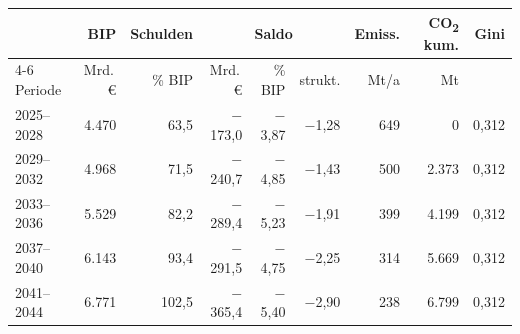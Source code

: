 \begin{tabular}{@{}lrrrrrrrr@{}}
\toprule
 & BIP & Schulden & \multicolumn{3}{c}{Saldo} & Emiss. & CO\textsubscript{2} kum. & Gini \\
\cmidrule(lr){4-6}
Periode & Mrd.\,\euro{} & \% BIP & Mrd.\,\euro{} & \% BIP & strukt. & Mt/a & Mt & \\
\midrule
2025--2028 & 4.470 & 63,5 & $-$173,0 & $-$3,87 & $-$1,28 & 649 & 0 & 0,312 \\
2029--2032 & 4.968 & 71,5 & $-$240,7 & $-$4,85 & $-$1,43 & 500 & 2.373 & 0,312 \\
2033--2036 & 5.529 & 82,2 & $-$289,4 & $-$5,23 & $-$1,91 & 399 & 4.199 & 0,312 \\
2037--2040 & 6.143 & 93,4 & $-$291,5 & $-$4,75 & $-$2,25 & 314 & 5.669 & 0,312 \\
2041--2044 & 6.771 & 102,5 & $-$365,4 & $-$5,40 & $-$2,90 & 238 & 6.799 & 0,312 \\
\bottomrule
\end{tabular}
